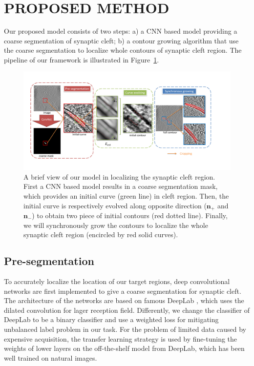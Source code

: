 \section{PROPOSED METHOD}
Our proposed model consists of two steps:
a) a CNN based model providing a coarse segmentation of synaptic cleft;
b) a contour growing algorithm that use the coarse segmentation to localize whole contours of synaptic cleft region.
The pipeline of our framework is illustrated in Figure~\ref{fig:cg}.

\begin{figure}[t]
    \begin{center}
        \includegraphics[width=7in]{figs/FigCG.pdf}
   \end{center}
\caption{A brief view of our model in localizing the synaptic cleft region. First a CNN based model results in a coarse segmentation mask, which provides an initial curve (green line) in cleft region.
        Then, the initial curve is respectively evolved along opposite direction ($\mathbf{n}_+$ and $\mathbf{n}_-$) to obtain two piece of initial contours (red dotted line).
        Finally, we will synchronously grow the contours to localize the whole synaptic cleft region (encircled by red solid curves).}
\label{fig:cg}
\end{figure}

\subsection{Pre-segmentation}
To accurately localize the location of our target regions, deep convolutional networks are first implemented to give a coarse segmentation for synaptic cleft.
The architecture of the networks are based on famous DeepLab \cite{Chen2016a}, which uses the dilated convolution for lager reception field.
Differently, we change the classifier of DeepLab to be a binary classifier and use a weighted loss for mitigating unbalanced label problem in our task.
For the problem of limited data caused by expensive acquisition, the transfer learning strategy is used by fine-tuning the weights of lower layers on the off-the-shelf model from DeepLab, which has been well trained on natural images.

